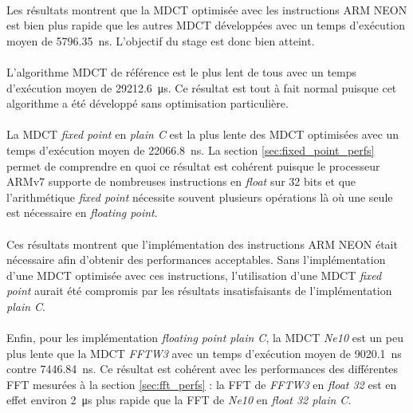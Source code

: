 \documentclass{article}
\begin{document}
    \paragraph{}
    Les résultats montrent que la MDCT optimisée avec les instructions ARM NEON est bien plus rapide que les autres MDCT développées avec un temps d'exécution moyen de \SI{5796.35}{\nano\second}. L'objectif du stage est donc bien atteint.

    \paragraph{}
    L'algorithme MDCT de référence est le plus lent de tous avec un temps d'exécution moyen de \SI{29212.6}{\micro\second}. Ce résultat est tout à fait normal puisque cet algorithme a été développé sans optimisation particulière.

    \paragraph{}
    La MDCT \emph{fixed point} en \emph{plain C} est la plus lente des MDCT optimisées avec un temps d'exécution moyen de \SI{22066.8}{\nano\second}. La section \ref{sec:fixed_point_perfs} permet de comprendre en quoi ce résultat est cohérent puisque le processeur ARMv7 supporte de nombreuses instructions en \emph{float} sur 32 bits et que l'arithmétique \emph{fixed point} nécessite souvent plusieurs opérations là où une seule est nécessaire en \emph{floating point}.

    \paragraph{}
    Ces résultats montrent que l'implémentation des instructions ARM NEON était nécessaire afin d'obtenir des performances acceptables. Sans l'implémentation d'une MDCT optimisée avec ces instructions, l'utilisation d'une MDCT \emph{fixed point} aurait été compromis par les résultats insatisfaisants de l'implémentation \emph{plain C}.

    \paragraph{}
    Enfin, pour les implémentation \emph{floating point plain C}, la MDCT \emph{Ne10} est un peu plus lente que la MDCT \emph{FFTW3} avec un temps d'exécution moyen de \SI{9020.1}{\nano\second} contre \SI{7446.84}{\nano\second}. Ce résultat est cohérent avec les performances des différentes FFT mesurées à la section \ref{sec:fft_perfs} : la FFT de \emph{FFTW3} en \emph{float 32} est en effet environ \SI{2}{\micro\second} plus rapide que la FFT de \emph{Ne10} en \emph{float 32 plain C}.
\end{document}
